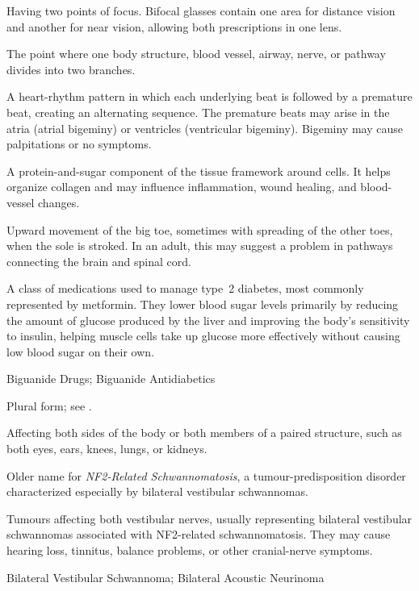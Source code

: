  Having two points of focus. Bifocal glasses contain one area for distance vision and another for near vision, allowing both prescriptions in one lens.

 The point where one body structure, blood vessel, airway, nerve, or pathway divides into two branches.

 A heart-rhythm pattern in which each underlying beat is followed by a premature beat, creating an alternating sequence. The premature beats may arise in the atria (atrial bigeminy) or ventricles (ventricular bigeminy). Bigeminy may cause palpitations or no symptoms.

 A protein-and-sugar component of the tissue framework around cells. It helps organize collagen and may influence inflammation, wound healing, and blood-vessel changes.

 Upward movement of the big toe, sometimes with spreading of the other toes, when the sole is stroked. In an adult, this may suggest a problem in pathways connecting the brain and spinal cord.

 A class of medications used to manage type~2 diabetes, most commonly represented by metformin. They lower blood sugar levels primarily by reducing the amount of glucose produced by the liver and improving the body's sensitivity to insulin, helping muscle cells take up glucose more effectively without causing low blood sugar on their own.

\synonyms
Biguanide Drugs; Biguanide Antidiabetics

 Plural form; see .

 Affecting both sides of the body or both members of a paired structure, such as both eyes, ears, knees, lungs, or kidneys.

 Older name for \textit{NF2-Related Schwannomatosis}, a tumour-predisposition disorder characterized especially by bilateral vestibular schwannomas.

 Tumours affecting both vestibular nerves, usually representing bilateral vestibular schwannomas associated with NF2-related schwannomatosis. They may cause hearing loss, tinnitus, balance problems, or other cranial-nerve symptoms.

\synonyms
Bilateral Vestibular Schwannoma; Bilateral Acoustic Neurinoma

